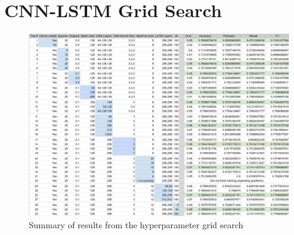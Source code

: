 \documentclass[format=sigconf, nonacm=true, review=true, screen=true]{acmart}
\begin{document}
\section{CNN-LSTM Grid Search} \label{app:CNN-LSTM_Grid}
\renewcommand{\thefigure}{B.\arabic{figure}}
\setcounter{figure}{0}
\begin{figure}[H]
    \centering
    \includegraphics[width=\columnwidth]{figures/cnn-lstm_grid_search.png}
    \caption{Summary of results from the hyperparameter grid search}
    \label{fig:cnn-lstm_grid_table}
\end{figure}
\end{document}
